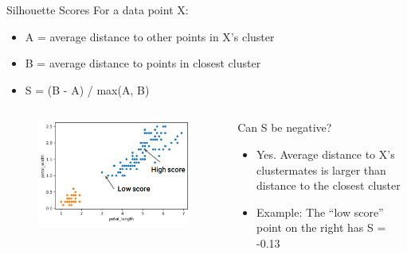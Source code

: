 \documentclass[aspectratio=169]{../latex_main/tntbeamer}  %
\begin{document}
	
	
	\begin{frame}{Silhouette Scores}
	    For a data point X:
	    \begin{itemize}
	        \item A = average distance to other points in X’s cluster 
	        \item B = average distance to points in closest cluster
	        \item S = (B - A) / max(A, B)
	    \end{itemize}
	    \begin{columns}
	        \begin{column}{.5\textwidth}
	                \begin{figure}
	                    \centering
	                    \includegraphics[scale=.35]{Bild57}
	                \end{figure}
	        \end{column}
	        
	        
	        \begin{column}{.5\textwidth}
	               Can S be negative?
	               \pause
	               \begin{itemize}
	                   \item Yes. Average distance to X’s clustermates is larger than distance to the closest cluster
	                   \pause
	                   \item Example: The “low score” point on the right has  S = -0.13
	               \end{itemize}
	        \end{column}
	        
	        
	    \end{columns}
	\end{frame}
	
\end{document}

